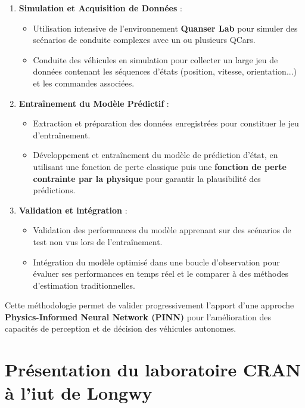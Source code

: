 \documentclass[12pt, a4paper]{report}
\begin{document}
\begin{enumerate}
    \item \textbf{Simulation et Acquisition de Données} :
    \begin{itemize}
        \item Utilisation intensive de l'environnement \textbf{Quanser Lab} pour simuler des scénarios de conduite complexes avec un ou plusieurs QCars.
        \item Conduite des véhicules en simulation pour collecter un large jeu de données contenant les séquences d'états (position, vitesse, orientation...) et les commandes associées.
    \end{itemize}
    
    \item \textbf{Entraînement du Modèle Prédictif} :
    \begin{itemize}
        \item Extraction et préparation des données enregistrées pour constituer le jeu d'entraînement.
        \item Développement et entraînement du modèle de prédiction d'état, en utilisant une fonction de perte classique puis une \textbf{fonction de perte contrainte par la physique} pour garantir la plausibilité des prédictions.
    \end{itemize}
    
    \item \textbf{Validation et intégration} :
    \begin{itemize}
        \item Validation des performances du modèle apprenant sur des scénarios de test non vus lors de l'entraînement.
        \item Intégration du modèle optimisé dans une boucle d'observation pour évaluer ses performances en temps réel et le comparer à des méthodes d'estimation traditionnelles.
    \end{itemize}
\end{enumerate}

Cette méthodologie permet de valider progressivement l'apport d'une approche \textbf{Physics-Informed Neural Network (PINN)} pour l'amélioration des capacités de perception et de décision des véhicules autonomes.
\newpage 

\section{Présentation du laboratoire CRAN à l'iut de Longwy}
\end{document}
